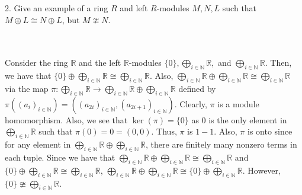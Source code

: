 2. Give an example of a ring $R$ and left $R$-modules $M,N,L$ such that $M\oplus L\cong N\oplus L$, but
$M\ncong N$.\\\\

\begin{solution}\renewcommand{\qedsymbol}{}\ \\
    Consider the ring $\mathbb{R}$ and the left $\mathbb{R}$-modules
    $\{0\},\bigoplus_{i\in\mathbb{N}}\mathbb{R},$ and $\bigoplus_{i\in\mathbb{N}}\mathbb{R}$. Then, we
    have that
    $\{0\}\oplus\bigoplus_{i\in\mathbb{N}}\mathbb{R}\cong\bigoplus_{i\in\mathbb{N}}\mathbb{R}$. Also,
    $\bigoplus_{i\in\mathbb{N}}\mathbb{R}\oplus\bigoplus_{i\in\mathbb{N}}\mathbb{R}\cong
    \bigoplus_{i\in\mathbb{N}}\mathbb{R}$ via the map
    $\pi:\bigoplus_{i\in\mathbb{N}}\mathbb{R}\rightarrow\bigoplus_{i\in\mathbb{N}}\mathbb{R}\oplus
    \bigoplus_{i\in\mathbb{N}}\mathbb{R}$ defined by
    $\pi((a_i)_{i\in\mathbb{N}})=((a_{2i})_{i\in\mathbb{N}},(a_{2i+1})_{i\in\mathbb{N}})$. Clearly,
    $\pi$ is a module homomorphism. Also, we see that $\ker(\pi)=\{0\}$ as $0$ is the only element in
    $\bigoplus_{i\in\mathbb{N}}\mathbb{R}$ such that $\pi(0)=0=(0,0)$. Thus, $\pi$ is $1-1$. Also,
    $\pi$ is onto since for any element in
    $\bigoplus_{i\in\mathbb{N}}\mathbb{R}\oplus\bigoplus_{i\in\mathbb{N}}\mathbb{R}$, there are finitely
    many nonzero terms in each tuple. Since we have that
    $\bigoplus_{i\in\mathbb{N}}\mathbb{R}\oplus\bigoplus_{i\in\mathbb{N}}\mathbb{R}\cong
    \bigoplus_{i\in\mathbb{N}}\mathbb{R}$ and
    $\{0\}\oplus\bigoplus_{i\in\mathbb{N}}\mathbb{R}\cong\bigoplus_{i\in\mathbb{N}}\mathbb{R}$,
    $\bigoplus_{i\in\mathbb{N}}\mathbb{R}\oplus\bigoplus_{i\in\mathbb{N}}\mathbb{R}\cong\{0\}\oplus
    \bigoplus_{i\in\mathbb{N}}\mathbb{R}$. However, $\{0\}\ncong\bigoplus_{i\in\mathbb{N}}\mathbb{R}$.


\end{solution}